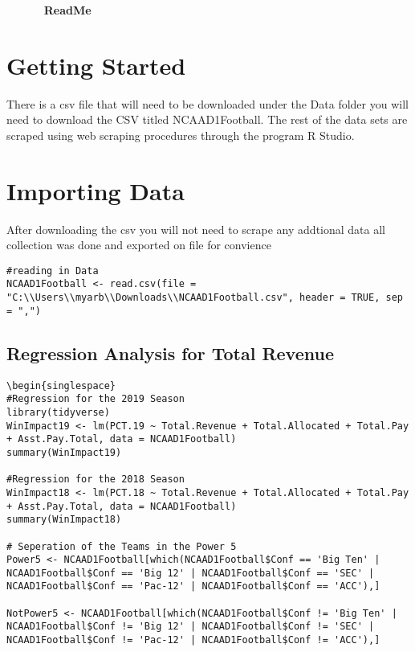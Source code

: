 \documentclass{article}
\begin{document}
\begin{flushleft}
~~~~~~
\textbf{ReadMe}
~~~~~~
\section{Getting Started}
There is a csv file that will need to be downloaded under the Data folder 
    you will need to download the CSV titled NCAAD1Football. The rest of the data sets are scraped using web scraping procedures through the program R Studio. 
\section{Importing Data}
After downloading the csv you will not need to scrape any addtional data all collection was done and exported on file for convience
\begin{singlespace}
\begin{lstlisting}
#reading in Data 
NCAAD1Football <- read.csv(file = "C:\\Users\\myarb\\Downloads\\NCAAD1Football.csv", header = TRUE, sep = ",")

\end{lstlisting}
\end{singlespace}
\subsection{Regression Analysis for Total Revenue}
\begin{lstlisting}
\begin{singlespace}
#Regression for the 2019 Season
library(tidyverse)
WinImpact19 <- lm(PCT.19 ~ Total.Revenue + Total.Allocated + Total.Pay + Asst.Pay.Total, data = NCAAD1Football)
summary(WinImpact19)

#Regression for the 2018 Season 
WinImpact18 <- lm(PCT.18 ~ Total.Revenue + Total.Allocated + Total.Pay + Asst.Pay.Total, data = NCAAD1Football)
summary(WinImpact18)

# Seperation of the Teams in the Power 5 
Power5 <- NCAAD1Football[which(NCAAD1Football$Conf == 'Big Ten' | NCAAD1Football$Conf == 'Big 12' | NCAAD1Football$Conf == 'SEC' | NCAAD1Football$Conf == 'Pac-12' | NCAAD1Football$Conf == 'ACC'),]

NotPower5 <- NCAAD1Football[which(NCAAD1Football$Conf != 'Big Ten' | NCAAD1Football$Conf != 'Big 12' | NCAAD1Football$Conf != 'SEC' | NCAAD1Football$Conf != 'Pac-12' | NCAAD1Football$Conf != 'ACC'),]


\end{lstlisting}
\end{flushleft}
\end{document}
